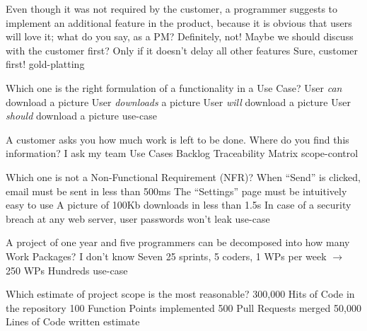 \documentclass{article}
\begin{document}


\pmbaQuestion
  {Even though it was not required by the customer, a programmer suggests to implement an additional feature in the product, because it is obvious that users will love it; what do you say, as a PM?}
  {Definitely, not!}
  {Maybe we should discuss with the customer first?}
  {Only if it doesn't delay all other features}
  {Sure, customer first!}
  {gold-platting}

\pmbaQuestion
  {Which one is the right formulation of a functionality in a Use Case?}
  {User \emph{can} download a picture}
  {User \emph{downloads} a picture}
  {User \emph{will} download a picture}
  {User \emph{should} download a picture}
  {use-case}

\pmbaQuestion
  {A customer asks you how much work is left to be done. Where do you find this information?}
  {I ask my team}
  {Use Cases}
  {Backlog}
  {Traceability Matrix}
  {scope-control}

\pmbaQuestion
  {Which one is not a Non-Functional Requirement (NFR)?}
  {When ``Send'' is clicked, email must be sent in less than 500ms}
  {The ``Settings'' page must be intuitively easy to use}
  {A picture of 100Kb downloads in less than 1.5s}
  {In case of a security breach at any web server, user passwords won't leak}
  {use-case}

\pmbaQuestion
  {A project of one year and five programmers can be decomposed into how many Work Packages?}
  {I don't know}
  {Seven}
  {25 sprints, 5 coders, 1 WPs per week \(\to\) 250 WPs}
  {Hundreds}
  {use-case}

\pmbaQuestion
  {Which estimate of project scope is the most reasonable?}
  {300,000 Hits of Code in the repository}
  {100 Function Points implemented}
  {500 Pull Requests merged}
  {50,000 Lines of Code written}
  {estimate}

\end{document}
